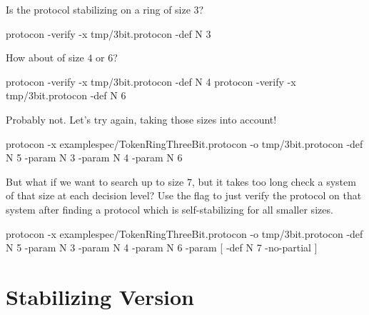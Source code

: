Is the protocol stabilizing on a ring of size $3$?
\begin{code}
protocon -verify -x tmp/3bit.protocon -def N 3
\end{code}

How about of size $4$ or $6$?
\begin{code}
protocon -verify -x tmp/3bit.protocon -def N 4
protocon -verify -x tmp/3bit.protocon -def N 6
\end{code}

Probably not.
Let's try again, taking those sizes into account!
\begin{code}
protocon -x examplespec/TokenRingThreeBit.protocon -o tmp/3bit.protocon -def N 5 -param N 3 -param N 4 -param N 6
\end{code}

But what if we want to search up to size $7$, but it takes too long check a system of that size at each decision level?
Use the  flag to just verify the protocol on that system after finding a protocol which is self-stabilizing for all smaller sizes.
\begin{code}
protocon -x examplespec/TokenRingThreeBit.protocon -o tmp/3bit.protocon -def N 5 -param N 3 -param N 4 -param N 6 -param [ -def N 7 -no-partial ]
\end{code}

\section{Stabilizing Version}

